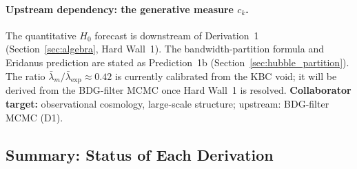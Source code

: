 \documentclass[11pt,a4paper]{article}
\theoremstyle{plain}
\theoremstyle{definition}
\theoremstyle{remark}
\begin{document}
\paragraph{Upstream dependency: the generative measure $c_k$.}
The quantitative $H_0$ forecast is downstream of Derivation~1
(Section~\ref{sec:algebra}, Hard Wall~1). The bandwidth-partition formula
and Eridanus prediction are stated as Prediction~1b
(Section~\ref{sec:hubble_partition}). The ratio
$\bar\lambda_m/\bar\lambda_{\mathrm{exp}} \approx 0.42$ is currently calibrated
from the KBC void; it will be derived from the BDG-filter MCMC once Hard Wall~1
is resolved.
\textbf{Collaborator target:} observational cosmology, large-scale structure;
upstream: BDG-filter MCMC (D1).

\subsection{Summary: Status of Each Derivation}
\end{document}
